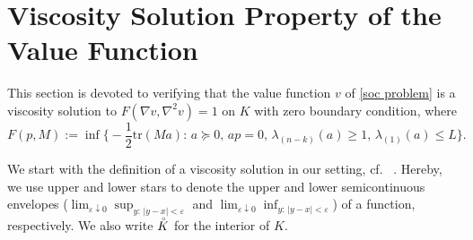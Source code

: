 \documentclass[11pt]{amsart}
\numberwithin{equation}{section}
\begin{document}
\section{Viscosity Solution Property of the Value Function} \label{sec3}

This section is devoted to verifying that the value function $v$ of \eqref{soc problem} is a viscosity solution to $F(\nabla v,\nabla^2 v)=1$ on $K$ with zero boundary condition, where 
\begin{equation} \label{codim k pde}
F(p, M):=\inf\bigg\{\!-\frac{1}{2}\mathrm{tr}(Ma):\, a\succeq 0,\, a p = 0,\,  \lambda_{(n-k)}(a)\geq 1,\, \lambda_{(1)}(a)\leq L\bigg\}.
\end{equation} 

\smallskip

We start with the definition of a viscosity solution in our setting, cf.~
\cite{CL, CEL, FS}. Hereby, we use upper and lower stars to denote the upper and lower semicontinuous envelopes ($\lim_{\varepsilon\downarrow0}\sup_{y:\,|y-x|<\varepsilon}$ and $\lim_{\varepsilon\downarrow0}\inf_{y:\,|y-x|<\varepsilon}$) of a function, respectively. We also write $\accentset{\circ}{K}$ for the interior of $K$. 
\end{document}
